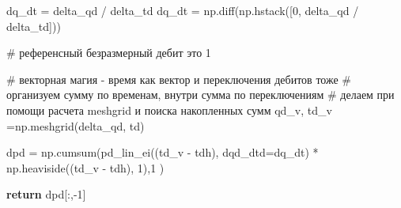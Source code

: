 \documentclass[
  russian,
  letterpaper,
  DIV=11,
  numbers=noendperiod,
  oneside]{scrartcl}
\newenvironment{Shaded}{\begin{snugshade}}{\end{snugshade}}
\newcommand{\CommentTok}[1]{\textcolor[rgb]{0.37,0.37,0.37}{#1}}
\newcommand{\ControlFlowTok}[1]{\textcolor[rgb]{0.00,0.23,0.31}{\textbf{#1}}}
\newcommand{\DecValTok}[1]{\textcolor[rgb]{0.68,0.00,0.00}{#1}}
\newcommand{\NormalTok}[1]{\textcolor[rgb]{0.00,0.23,0.31}{#1}}
\newcommand{\OperatorTok}[1]{\textcolor[rgb]{0.37,0.37,0.37}{#1}}
\begin{document}
\begin{Shaded}
\begin{Highlighting}[]
\NormalTok{    dq\_dt }\OperatorTok{=}\NormalTok{ delta\_qd }\OperatorTok{/}\NormalTok{ delta\_td}
\NormalTok{    dq\_dt }\OperatorTok{=}\NormalTok{ np.diff(np.hstack([}\DecValTok{0}\NormalTok{, delta\_qd }\OperatorTok{/}\NormalTok{ delta\_td]))}
    
    \CommentTok{\# референсный безразмерный дебит это 1}
    
    \CommentTok{\# векторная магия {-} время как вектор и переключения дебитов тоже }
    \CommentTok{\# организуем сумму по временам, внутри сумма по переключениям}
    \CommentTok{\# делаем при помощи расчета meshgrid и поиска накопленных сумм}
\NormalTok{    qd\_v, td\_v }\OperatorTok{=}\NormalTok{np.meshgrid(delta\_qd, td)}
    
\NormalTok{    dpd }\OperatorTok{=}\NormalTok{ np.cumsum(pd\_lin\_ei((td\_v }\OperatorTok{{-}}\NormalTok{ tdh), }
\NormalTok{                              dqd\_dtd}\OperatorTok{=}\NormalTok{dq\_dt) }\OperatorTok{*}\NormalTok{ np.heaviside((td\_v }\OperatorTok{{-}}\NormalTok{ tdh), }\DecValTok{1}\NormalTok{),}\DecValTok{1}\NormalTok{ )}

    \ControlFlowTok{return}\NormalTok{ dpd[:,}\OperatorTok{{-}}\DecValTok{1}\NormalTok{]}


\end{Highlighting}
\end{Shaded}
\end{document}
